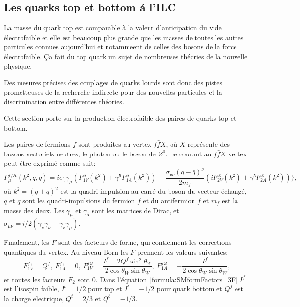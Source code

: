 \subsection*{Les quarks top et bottom \'a l'ILC}

La masse du quark top est comparable à la valeur d'anticipation du vide électrofaible et elle est beaucoup plus grande que les masses de toutes les autres particules connues aujourd'hui et notammeent de celles des bosons de la force électrofaible.
\c Ca fait du top quark un sujet de nombreuses théories de la nouvelle physique.

Des mesures précises des couplages de quarks lourds sont donc des pistes prometteuses de la recherche indirecte pour des nouvelles particules et la discrimination entre différentes théories.

Cette section porte sur la production électrofaible des paires de quarks top et bottom.

Les paires de fermions $f$ sont produites au vertex $f\bar{f}X$, où $X$ représente des bosons vectoriels neutres, le photon ou le boson de $Z^0$. Le courant au $f\bar{f}X$ vertex peut être exprimé comme suit:
\begin{equation}
\Gamma^{f\bar{f}X}_\mu (k^2,q,\bar{q}) = ie\{ \gamma_\mu (F^X_{1V}(k^2) + \gamma^5 F^X_{1A}(k^2)) - \frac{\sigma_{\mu\nu}(q-\bar{q})^\nu}{2m_f}(iF^X_{2V}(k^2) + \gamma^5 F^X_{2A}(k^2)) \},
\end{equation}
où $k^2= (q+\bar{q})^2$ est la quadri-impulsion au carré du boson du vecteur échangé, $q$ et $\bar{q} $ sont les quadri-impulsions du fermion $f$ et du antifermion $\bar{f}$ et $m_f$ est la masse des deux. Les $\gamma_\mu$ et $\gamma_5$ sont les matrices de Dirac, et $\sigma_{\mu\nu} = i/2(\gamma_\mu\gamma_\nu - \gamma_\nu\gamma_\mu)$.

Finalement, les $F$ sont des facteurs de forme, qui contiennent les corrections quantiques du vertex. Au niveau Born les $F$ prennent les valeurs suivantes:  
\begin{equation}
F^{f\gamma}_{1V} = Q^{f}, \ F^{f\gamma}_{1A} = 0, \ F^{fZ}_{1V} = \frac{I^f - 2Q^f\sin^2\theta_W}{2\cos\theta_W\sin\theta_W}, \ F^{fZ}_{1A} = - \frac{I^f}{2\cos\theta_W\sin\theta_W},
\label{formula:SMformFactors_3F}
\end{equation}
et toutes les facteurs $F_2$ sont 0. Dans l'équation~\ref{formula:SMformFactors_3F} $I^f$ est  l'isospin faible, $I^t = 1/2$ pour top et $I^b = -1/2$ pour quark bottom  et $Q^f$ est la charge electrique, $Q^t = 2/3$ et $Q^b = -1/3$.


